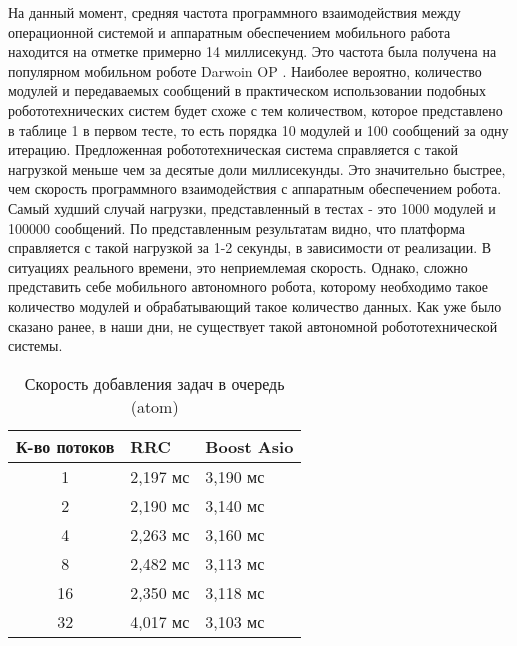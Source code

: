 На данный момент, средняя частота программного взаимодействия 
между операционной системой и аппаратным обеспечением мобильного 
работа находится на отметке примерно 14 миллисекунд. Это частота 
была получена на популярном мобильном роботе Darwoin OP 
\cite{ha2011development}. Наиболее вероятно, количество модулей 
и передаваемых сообщений в практическом использовании подобных 
робототехнических систем будет схоже с тем количеством, которое 
представлено в таблице 1 в первом тесте, то есть порядка 10 
модулей и 100 сообщений за одну итерацию. Предложенная 
робототехническая система справляется с такой нагрузкой меньше 
чем за десятые доли миллисекунды. Это значительно быстрее, чем 
скорость программного взаимодействия с аппаратным обеспечением 
робота. Самый худший случай нагрузки, представленный в тестах - 
это 1000 модулей и 100000 сообщений. По представленным 
результатам видно, что платформа справляется с такой нагрузкой 
за 1-2 секунды, в зависимости от реализации. В ситуациях 
реального времени, это неприемлемая скорость. Однако, сложно 
представить себе мобильного автономного робота, которому 
необходимо такое количество модулей и обрабатывающий такое 
количество данных. Как уже было сказано ранее, в наши дни, не 
существует такой автономной робототехнической системы.

\begin{table}[!htbp]
    \caption{\label{tab:atom_asio}Скорость добавления задач в 
    очередь (atom)}
    \begin{center}
        \begin{tabularx}{\linewidth}{|c|X|X|}
            \hline
            К-во потоков & RRC & Boost Asio  \\
            \hline
            1 & 2,197 мс & 3,190 мс \\
            \hline
            2 & 2,190 мс & 3,140 мс \\
            \hline
            4 & 2,263 мс & 3,160 мс \\
            \hline
            8 & 2,482 мс & 3,113 мс \\
            \hline
            16 & 2,350 мс & 3,118 мс \\
            \hline
            32 & 4,017 мс & 3,103 мс \\
            \hline
        \end{tabularx}
    \end{center}
\end{table}

